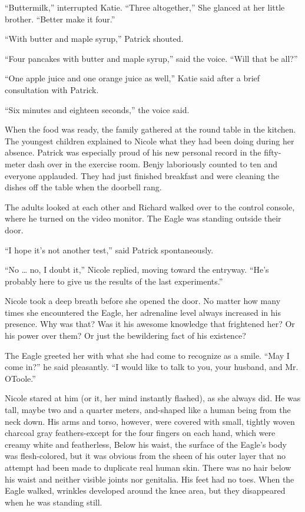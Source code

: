 \documentclass[]{article}
\begin{document}
{“Buttermilk,” interrupted Katie.  “Three altogether,” She glanced at her little brother.  “Better make it four.”

“With butter and maple syrup,” Patrick shouted.

“Four pancakes with butter and maple syrup,” said the voice.  “Will that be all?”

“One apple juice and one orange juice as well,” Katie said after a brief consultation with Patrick.

“Six minutes and eighteen seconds,” the voice said.

When the food was ready, the family gathered at the round table in the kitchen.  The youngest children explained to Nicole what they had been doing during her absence.  Patrick was especially proud of his new personal record in the fifty-meter dash over in the exercise room.  Benjy laboriously counted to ten and everyone applauded.  They had just finished breakfast and were cleaning the dishes off the table when the doorbell rang.

The adults looked at each other and Richard walked over to the control console, where he turned on the video monitor.  The Eagle was standing outside their door.

“I hope it’s not another test,” said Patrick spontaneously.

“No … no, I doubt it,” Nicole replied, moving toward the entryway.  “He’s probably here to give us the results of the last experiments.”

Nicole took a deep breath before she opened the door.  No matter how many times she encountered the Eagle, her adrenaline level always increased in his presence.  Why was that? Was it his awesome knowledge that frightened her? Or his power over them? Or just the bewildering fact of his existence?

The Eagle greeted her with what she had come to recognize as a smile.  “May I come in?” he said pleasantly.  “I would like to talk to you, your husband, and Mr.  OToole.”

Nicole stared at him (or it, her mind instantly flashed), as she always did.  He was tall, maybe two and a quarter meters, and-shaped like a human being from the neck down.  His arms and torso, however, were covered with small, tightly woven charcoal gray feathers-except for the four fingers on each hand, which were creamy white and featherless, Below his waist, the surface of the Eagle’s body was flesh-colored, but it was obvious from the sheen of his outer layer that no attempt had been made to duplicate real human skin.  There was no hair below his waist and neither visible joints nor genitalia.  His feet had no toes.  When the Eagle walked, wrinkles developed around the knee area, but they disappeared when he was standing still.

}
\end{document}
